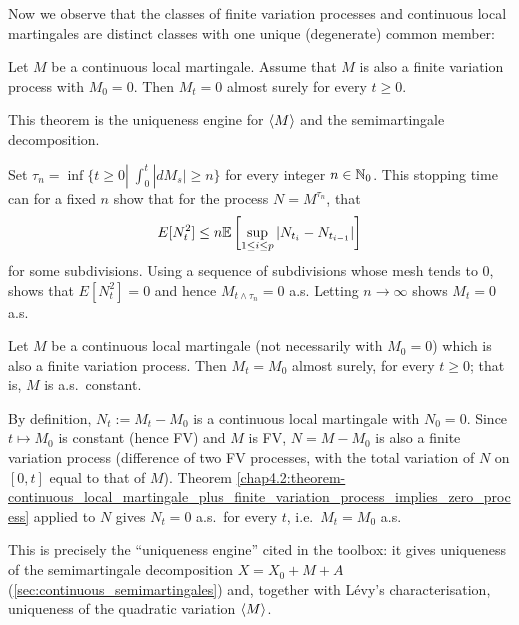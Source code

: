 Now we observe that the classes of finite variation processes and continuous local martingales are distinct classes with one unique (degenerate) common member: 
\begin{theorem}\label{chap4.2:theorem-continuous_local_martingale_plus_finite_variation_process_implies_zero_process}
Let $M$ be a continuous local martingale. Assume that $M$ is also a finite variation process with $M_0=0$. Then $M_t = 0$ almost surely for every $t \geq 0$.
\end{theorem}
\begin{quizbox} This theorem is the uniqueness engine for $\langle M\rangle$ and the semimartingale decomposition. \end{quizbox}
\begin{proofidea}
Set $\tau_n = \inf\{t \geq 0| \; \int_0^t|dM_s| \geq n\}$
for every integer $n \in \mathbb{N}_0$. This stopping time can for a fixed $n$ show that for the process $N=M^{\tau_n}$, that
$$E[N^2_t] \leq n \mathbb{E}\left[\sup_{1 \leq i \leq p} |N_{t_i}-N_{t_{i-1}}| \right]$$
for some subdivisions. Using a sequence of subdivisions whose mesh tends to 0, shows that $E[N^2_t]=0$ and hence $M_{t \land \tau_n}=0$ a.s. Letting $n \to \infty$ shows $M_t=0$ a.s.
\end{proofidea}

\begin{corollary}\label{chap4.2:corollary-continuous_FV_local_martingale_is_constant}
Let $M$ be a continuous local martingale (not necessarily with $M_0=0$) which is also a finite variation process. Then $M_t=M_0$ almost surely, for every $t \geq 0$; that is, $M$ is a.s.\ constant.
\end{corollary}

\begin{proofidea}
By definition, $N_t:=M_t-M_0$ is a continuous local martingale with $N_0=0$. Since $t \mapsto M_0$ is constant (hence FV) and $M$ is FV, $N=M-M_0$ is also a finite variation process (difference of two FV processes, with the total variation of $N$ on $[0,t]$ equal to that of $M$). Theorem \ref{chap4.2:theorem-continuous_local_martingale_plus_finite_variation_process_implies_zero_process} applied to $N$ gives $N_t=0$ a.s.\ for every $t$, i.e.\ $M_t=M_0$ a.s.
\end{proofidea}
\begin{usedin} This is precisely the ``uniqueness engine'' cited in the toolbox: it gives uniqueness of the semimartingale decomposition $X=X_0+M+A$ (\cref{sec:continuous_semimartingales}) and, together with Lévy's characterisation, uniqueness of the quadratic variation $\langle M\rangle$. \end{usedin}



